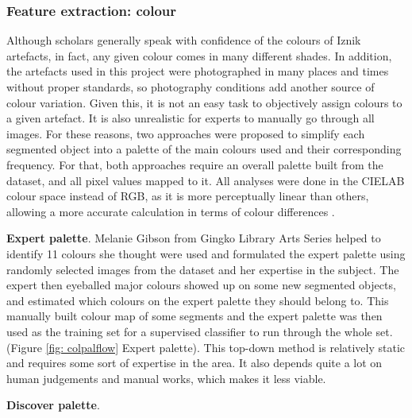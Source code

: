 \documentclass[11pt]{article}
\begin{document}
\subsubsection{Feature extraction: colour}
Although scholars generally speak with confidence of the colours of Iznik artefacts, in fact, any given colour comes in many different shades. In addition, the artefacts used in this project were photographed in many places and times without proper standards, so photography conditions add another source of colour variation. Given this, it is not an easy task to objectively assign colours to a given artefact. It is also unrealistic for experts to manually go through all images. For these reasons, two approaches were proposed to simplify each segmented object into a palette of the main colours used and their corresponding frequency. For that, both approaches require an overall palette built from the dataset, and all pixel values mapped to it. All analyses were done in the CIELAB colour space instead of RGB, as it is more perceptually linear than others, allowing a more accurate calculation in terms of colour differences \parencite{Luo2014}.\par
\textbf{Expert palette}.  
Melanie Gibson from Gingko Library Arts Series helped to identify 11 colours she thought were used and formulated the expert palette using randomly selected images from the dataset and her expertise in the subject. The expert then eyeballed major colours showed up on some new segmented objects, and estimated which colours on the expert palette they should belong to. This manually built colour map of some segments and the expert palette was then used as the training set for a supervised classifier to run through the whole set. (Figure \ref{fig: colpalflow} Expert palette). This top-down method is relatively static and requires some sort of expertise in the area. It also depends quite a lot on human judgements and manual works, which makes it less viable.\par
\textbf{Discover palette}.
\end{document}
